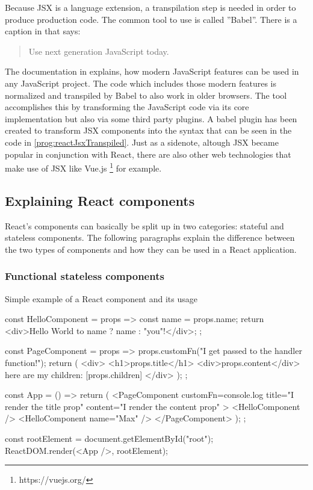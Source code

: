 Because JSX is a language extension, a transpilation step is needed in order to produce production code. The common tool to use is called ''Babel''. There is a caption in \cite{Babel} that says: \begin{quote}\begin{english}Use next generation JavaScript today.\end{english}\end{quote} The documentation in \cite[/docs/en]{Babel} explains, how modern JavaScript features can be used in any JavaScript project. The code which includes those modern features is normalized and transpiled by Babel to also work in older browsers. The tool accomplishes this by transforming the JavaScript code via its core implementation but also via some third party plugins. A babel plugin has been created to transform JSX components into the syntax that can be seen in the code in \ref{prog:reactJsxTranspiled}. Just as a sidenote, altough JSX became popular in conjunction with React, there are also other web technologies that make use of JSX like Vue.js \footnote{https://vuejs.org/} for example.

\subsection{Explaining React components}
\label{sec:reactComponents}

React's components can basically be split up in two categories: stateful and stateless components. The following paragraphs explain the difference between the two types of components and how they can be used in a React application.

\subsubsection{Functional stateless components}

\begin{program}
\caption{Simple example of a React component and its usage} 
\label{prog:reactHelloWorld}
\begin{JsCode}
const HelloComponent = props => {
  const name = props.name;
  return <div>Hello World to {name ? name : "you"}!</div>;
};

const PageComponent = props => {
  props.customFn("I get passed to the handler function!");
  return (
    <div>
      <h1>{props.title}</h1>
      <div>{props.content}</div>
      here are my children: [{props.children}]
    </div>
  );
};

const App = () => {
  return (
    <PageComponent
      customFn={console.log}
      title="I render the title prop"
      content="I render the content prop"
    >
      <HelloComponent />
      <HelloComponent name={"Max"} />
    </PageComponent>
  );
};

const rootElement = document.getElementById("root");
ReactDOM.render(<App />, rootElement);  
\end{JsCode}
\end{program}

